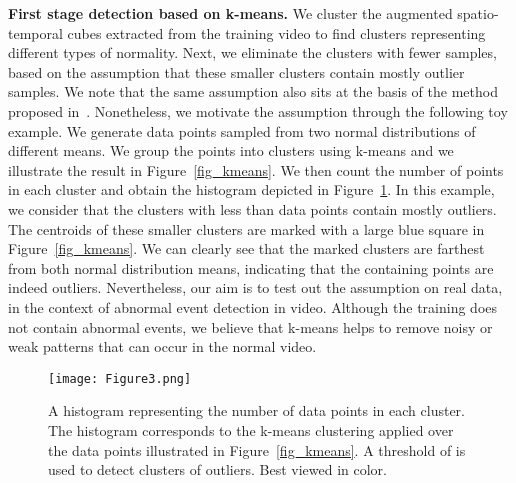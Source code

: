 \documentclass[10pt,twocolumn,letterpaper]{article}
\begin{document}
\noindent
{\bf First stage detection based on k-means.}
We cluster the augmented spatio-temporal cubes extracted from the training video to find clusters representing different types of normality. Next, we eliminate the clusters with fewer samples, based on the assumption that these smaller clusters contain mostly outlier samples. We note that the same assumption also sits at the basis of the method proposed in~\cite{Auslander-SPIE-2011}. Nonetheless, we motivate the assumption through the following toy example. We generate  data points sampled from two normal distributions of different means. We group the points into  clusters using k-means and we illustrate the result in Figure~\ref{fig_kmeans}. We then count the number of points in each cluster and obtain the histogram depicted in Figure~\ref{fig_hist}. In this example, we consider that the clusters with less than  data points contain mostly outliers. The centroids of these smaller clusters are marked with a large blue square in Figure~\ref{fig_kmeans}. We can clearly see that the marked clusters are farthest from both normal distribution means, indicating that the containing points are indeed outliers. Nevertheless, our aim is to test out the assumption on real data, in the context of abnormal event detection in video. Although the training does not contain abnormal events, we believe that k-means helps to remove noisy or weak patterns that can occur in the normal video. 

\begin{figure}[!t]
\begin{center}
\texttt{[image: Figure3.png]}
\end{center}
\vspace*{-0.2cm}
\caption{A histogram representing the number of data points in each cluster. The histogram corresponds to the k-means clustering applied over the  data points illustrated in Figure~\ref{fig_kmeans}. A threshold of  is used to detect clusters of outliers. Best viewed in color.}
\label{fig_hist}
\vspace*{-0.4cm}
\end{figure}
\end{document}
